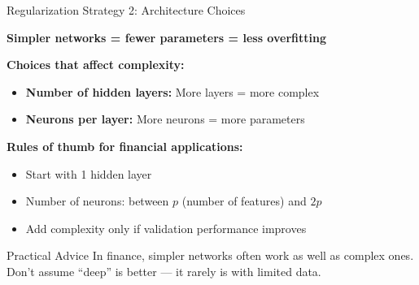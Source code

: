 \documentclass[10pt]{beamer}
\begin{document}
\begin{frame}{Regularization Strategy 2: Architecture Choices}

  \textbf{Simpler networks = fewer parameters = less overfitting}

  \vspace{1em}
  \textbf{Choices that affect complexity:}
  \begin{itemize}
    \item \textbf{Number of hidden layers:} More layers = more complex
    \item \textbf{Neurons per layer:} More neurons = more parameters
  \end{itemize}

  \vspace{1em}
  \textbf{Rules of thumb for financial applications:}
  \begin{itemize}
    \item Start with 1 hidden layer
    \item Number of neurons: between $p$ (number of features) and $2p$
    \item Add complexity only if validation performance improves
  \end{itemize}

  \vspace{1em}
  \begin{block}{Practical Advice}
    In finance, simpler networks often work as well as complex ones. Don't assume ``deep'' is better --- it rarely is with limited data.
  \end{block}
\end{frame}

\end{document}

